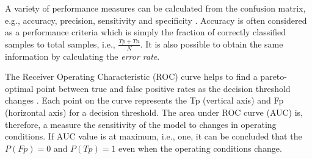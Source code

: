 A variety of performance measures can be calculated from the confusion matrix, e.g., accuracy, precision, sensitivity and specificity \cite{Bradley1997}. Accuracy is often considered as a performance criteria which is simply the fraction of correctly classified samples to total samples, i.e., {\large $\frac{Tp + Tn}{N}$}. It is also possible to obtain the same information by calculating the \textit{error rate}.

The Receiver Operating Characteristic (ROC) curve helps to find a pareto-optimal point between true and false positive rates as the decision threshold changes \cite{Bradley1997}. Each point on the curve represents the Tp (vertical axis) and Fp (horizontal axis) for a decision threshold. The area under ROC curve (AUC) is, therefore, a measure the sensitivity of the model to changes in operating conditions. If AUC value is at maximum, i.e., one, it can be concluded that the $P(Fp) = 0$ and $P(Tp) = 1$ even when the operating conditions change. 
